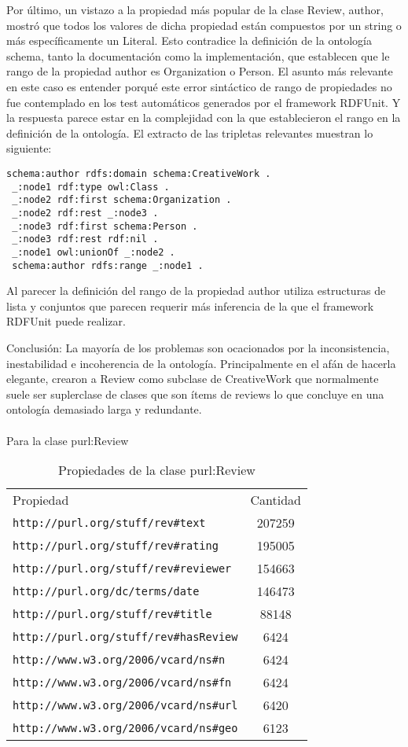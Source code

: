  Por último, un vistazo a la propiedad más popular de la clase Review, author, mostró que todos los valores de dicha propiedad están compuestos 
 por un string o más específicamente un Literal. Esto contradice la definición de la ontología schema, tanto la documentación como la implementación, que
 establecen que le rango de la propiedad author es Organization o Person. 
 El asunto más relevante en este caso es entender porqué este error sintáctico de rango de propiedades no fue contemplado en los test 
 automáticos generados por el framework RDFUnit.
 Y la respuesta parece estar en la complejidad con la que establecieron el rango en la definición de la ontología. El extracto de las 
 tripletas relevantes muestran lo siguiente:
 \begin{lstlisting}[frame=single]
 schema:author rdfs:domain schema:CreativeWork .
 _:node1 rdf:type owl:Class .
 _:node2 rdf:first schema:Organization .
 _:node2 rdf:rest _:node3 .
 _:node3 rdf:first schema:Person .
 _:node3 rdf:rest rdf:nil .
 _:node1 owl:unionOf _:node2 .
 schema:author rdfs:range _:node1 .
 \end{lstlisting}
 
 Al parecer la definición del rango de la propiedad author utiliza estructuras de lista y conjuntos que parecen requerir más inferencia de la 
 que el framework RDFUnit puede realizar.
 
 Conclusión: La mayoría de los problemas son ocacionados por la inconsistencia, inestabilidad e incoherencia de la ontología. Principalmente 
 en el afán de hacerla elegante, crearon a Review como subclase de CreativeWork que normalmente suele ser suplerclase de clases que son ítems de reviews
 lo que concluye en una ontología demasiado larga y redundante.
 \\
 \\
 Para la clase purl:Review\\
 \begin{table}[h]
 \begin{tabular}{| l | c | }
 Propiedad & Cantidad \\
 \verb|http://purl.org/stuff/rev#text| & 207259\\
 \verb|http://purl.org/stuff/rev#rating| & 195005\\
 \verb|http://purl.org/stuff/rev#reviewer| & 154663\\
 \verb|http://purl.org/dc/terms/date| & 146473\\
 \verb|http://purl.org/stuff/rev#title| & 88148\\
 \verb|http://purl.org/stuff/rev#hasReview| & 6424\\
 \verb|http://www.w3.org/2006/vcard/ns#n| & 6424\\
 \verb|http://www.w3.org/2006/vcard/ns#fn| & 6424\\
 \verb|http://www.w3.org/2006/vcard/ns#url| & 6420\\
 \verb|http://www.w3.org/2006/vcard/ns#geo| & 6123
\end{tabular}
\caption{Propiedades de la clase purl:Review}
\label{table:PropertiesStatisticsPurl}
\end{table}
\\ 

